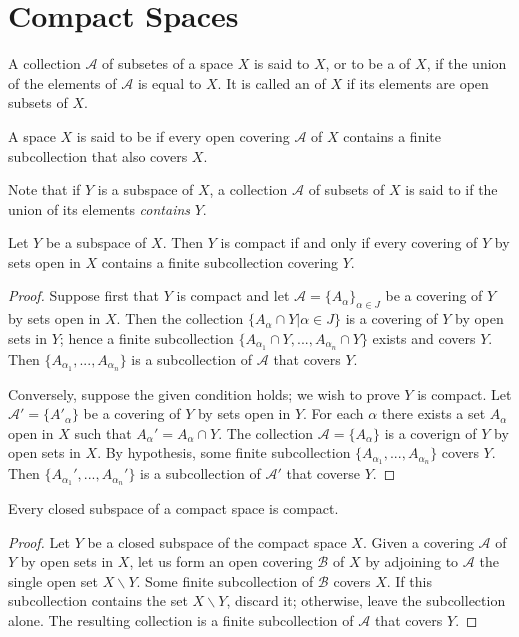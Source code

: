 \documentclass[12pt, a4paper, oneside, openright, titlepage]{book}
\begin{document}
\section{Compact Spaces}

\begin{defn}
    A collection $\mathcal{A}$ of subsetes of a space $X$ is said to  $X$, or to be a  of $X$, if the union of the elements of $\mathcal{A}$ is equal to $X$. It is called an  of $X$ if its elements are open subsets of $X$.
\end{defn}

\begin{defn}
    A space $X$ is said to be  if every open covering $\mathcal{A}$ of $X$ contains a finite subcollection that also covers $X$.
\end{defn}


Note that if $Y$ is a subspace of $X$, a collection $\mathcal{A}$ of subsets of $X$ is said to  if the union of its elements \emph{contains} $Y$.

\begin{lem}
     Let $Y$ be a subspace of $X$. Then $Y$ is compact if and only if every covering of $Y$ by sets open in $X$ contains a finite subcollection covering $Y$.
\end{lem}
\begin{proof}
    Suppose first that $Y$ is compact and let $\mathcal{A} = \{A_{\alpha}\}_{\alpha \in J}$ be a covering of $Y$ by sets open in $X$. Then the collection $\{A_{\alpha} \cap Y\vert \alpha \in J\}$ is a covering of $Y$ by open sets in $Y$; hence a finite subcollection $\{A_{\alpha_1}\cap Y,...,A_{\alpha_n}\cap Y\}$ exists and covers $Y$. Then $\{A_{\alpha_1},...,A_{\alpha_n}\}$ is a subcollection of $\mathcal{A}$ that covers $Y$.

    Conversely, suppose the given condition holds; we wish to prove $Y$ is compact. Let $\mathcal{A}' = \{A'_{\alpha}\}$ be a covering of $Y$ by sets open in $Y$. For each $\alpha$ there exists a set $A_{\alpha}$ open in $X$ such that $A_{\alpha}' = A_{\alpha}\cap Y$. The collection $\mathcal{A} = \{A_{\alpha}\}$ is a coverign of $Y$ by open sets in $X$. By hypothesis, some finite subcollection $\{A_{\alpha_1},...,A_{\alpha_n}\}$ covers $Y$. Then $\{A_{\alpha_1}',...,A_{\alpha_n}'\}$ is a subcollection of $\mathcal{A}'$ that coverse $Y$.
\end{proof}

\begin{thm}
    Every closed subspace of a compact space is compact.
\end{thm}
\begin{proof}
    Let $Y$ be a closed subspace of the compact space $X$. Given a covering $\mathcal{A}$ of $Y$ by open sets in $X$, let us form an open covering $\mathcal{B}$ of $X$ by adjoining to $\mathcal{A}$ the single open set $X\backslash Y$. Some finite subcollection of $\mathcal{B}$ covers $X$. If this subcollection contains the set $X\backslash Y$, discard it; otherwise, leave the subcollection alone. The resulting collection is a finite subcollection of $\mathcal{A}$ that covers $Y$.
\end{proof}
\end{document}

